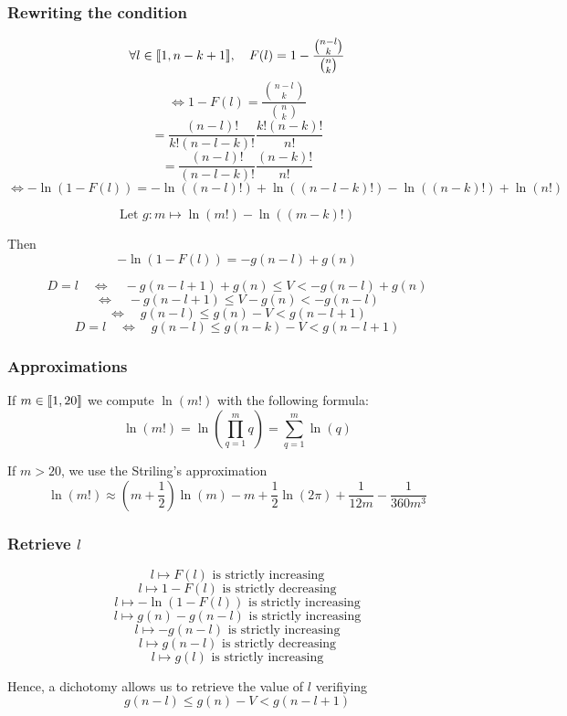 	\subsubsection{Rewriting the condition}
		\[\forall l\in\llbracket1, n - k + 1\rrbracket, \quad F(l) = 1 -\frac{\binom{n - l}{k}}{\binom{n}{k}}\]
		\[\Leftrightarrow 1 - F(l) = \frac{\binom{n - l}{k}}{\binom{n}{k}}\]
		\[= \frac{(n - l)!}{k!(n - l - k)!}\frac{k!(n - k)!}{n!}\]
		\[= \frac{(n - l)!}{(n - l - k)!}\frac{(n - k)!}{n!}\]
		\[\Leftrightarrow -\ln\left(1 - F(l)\right) = -\ln\left((n - l)!\right)+\ln\left((n - l - k)!\right) -\ln\left((n - k)!\right) + \ln\left(n!\right)\]
		\[\]
		
		\[\text{Let } g: m\mapsto\ln(m!) - \ln((m - k)!)\]
		
		Then
		\[\boxed{-\ln\left(1 - F(l)\right) = -g(n - l) + g(n)}\]
		\[\]
		
		\[D = l \quad \Leftrightarrow \quad -g(n - l + 1) + g(n)\leq V < -g(n - l) + g(n)\]
		\[\Leftrightarrow \quad -g(n - l + 1) \leq V - g(n)< -g(n - l) \]
		\[\Leftrightarrow \quad g(n - l)\leq g(n) - V < g(n - l + 1)\]
		\[\boxed{D = l \quad \Leftrightarrow \quad g(n - l)\leq g(n - k) - V < g(n - l + 1)}\]
	
	\subsubsection{Approximations}
		If $m\in\llbracket1, 20\rrbracket$ we compute $\ln(m!)$ with the following formula:
		\[\ln(m!) = \ln\left(\prod_{q = 1}^{m}{q}\right) = \sum_{q = 1}^{m}{\ln(q)}\]
		\[\]
		
		If $m > 20$, we use the Striling's approximation
		\[\ln(m!)\approx \left(m+\frac{1}{2}\right)\ln(m) - m + \frac{1}{2}\ln(2\pi) + \frac{1}{12m} - \frac{1}{360m^3}\]
		
	\subsubsection{Retrieve $l$}
		\[l\mapsto F(l) \text{ is strictly increasing}\]
		\[l\mapsto 1 - F(l) \text{ is strictly decreasing}\]
		\[l\mapsto -\ln\left(1 - F(l)\right) \text{ is strictly increasing}\]
		\[l\mapsto g(n) - g(n - l) \text{ is strictly increasing}\]
		\[l\mapsto - g(n - l) \text{ is strictly increasing}\]
		\[l\mapsto g(n - l) \text{ is strictly decreasing}\]
		\[l\mapsto g(l) \text{ is strictly increasing}\]
		
		Hence, a dichotomy allows us to retrieve the value of $l$ verifiying
		\[g(n - l)\leq g(n) - V < g(n - l + 1)\]